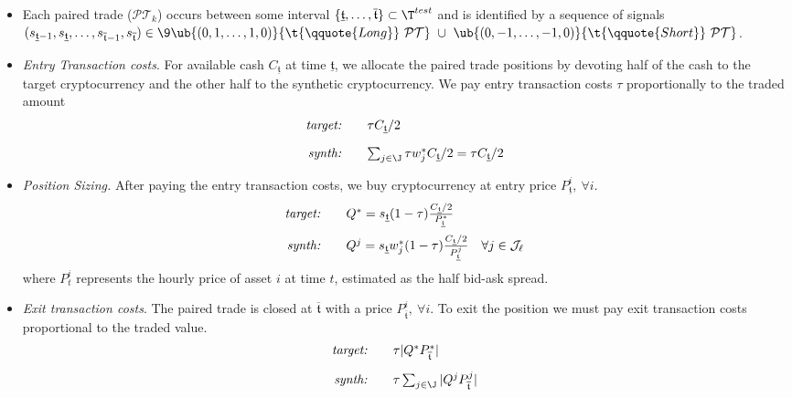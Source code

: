 \begin{itemize}
\item Each paired trade ($\mathcal{PT}_k$) occurs between some interval 
$\{\underline{\mathfrak t},\ldots, \overline{\mathfrak t}\}\subset \T^{test}$  
and is identified by a sequence of signals 
$(
s_{\underline{\mathfrak{t}}-1},
s_{\underline{\mathfrak{t}}},
\ldots,
s_{\overline{\mathfrak{t}}-1},
s_{\overline{\mathfrak{t}}} 
)
\in 
\9{ 
\ub{(0,1,\ldots,1,0)}{\t{\qquote{Long}}~\mathcal{PT}}
~\cup~
\ub{(0,-1,\ldots,-1,0)}{\t{\qquote{Short}}~\mathcal{PT}}
}$. 

\item \textit{Entry Transaction costs}. For available cash $C_{\underline{\mathfrak{t}}}$ at time $\underline{\mathfrak{t}}$, we allocate the paired trade positions by devoting half of the cash to the target cryptocurrency and the other half to the synthetic cryptocurrency. We pay entry transaction costs $\tau$ proportionally to the traded amount
$$
\begin{array}{rlll}
\text{\textit{target:}} 
&&
\tau C_{\underline{\mathfrak{t}}} / 2
\\[1em]
\text{\textit{synth:}} 
&&
\sum_{j\in\J}\tau w_j^* C_{\underline{\mathfrak{t}}}/2 = \tau C_{\underline{\mathfrak{t}}} / 2
\end{array}
$$ 


\item \textit{Position Sizing.} After paying the entry transaction costs, we buy cryptocurrency at entry price $P_{\underline{\mathfrak{t}}}^i, ~\forall i$.
$$
\begin{array}{rlll}
\text{\textit{target:}} 
&&
Q^* = s_{\underline{\mathfrak{t}}} (1-\tau) \frac{C_{\underline{\mathfrak{t}}}/2}{P_{\underline{\mathfrak{t}}}^*}
\\[1em]
\text{\textit{synth:}} 
&&
Q^j = s_{\underline{\mathfrak{t}}} w_j^*(1-\tau)\frac{C_{\underline{\mathfrak{t}}}/2}{P_{\underline{\mathfrak{t}}}^j} 
\quad \forall j \in \mathcal{J}_\ell
\end{array}
$$
where $P_t^i$ represents the hourly price of asset $i$ at time $t$, estimated as the half bid-ask spread.


\item \textit{Exit transaction costs}. The paired trade is closed at $\overline{\mathfrak{t}}$ with a price $P_{\overline{\mathfrak{t}}}^i,~\forall i$.
To exit the position we must pay exit transaction costs proportional to the traded value. 
$$
\begin{array}{rlll}
\text{\textit{target:}} 
&&
\tau | Q^* P_{\overline{\mathfrak{t}}}^* |
\\[1em]
\text{\textit{synth:}} 
&&
\tau \sum_{j\in\J}  |Q^j P_{\overline{\mathfrak{t}}}^j|
\end{array}
$$



\end{itemize}
